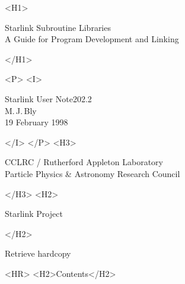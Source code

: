 \documentclass[twoside,11pt]{article}
\newcommand{\stardoccategory}  {Starlink User Note}
\newcommand{\stardocsource}    {sun\stardocnumber}
\newcommand{\stardocnumber}    {202.2}
\newcommand{\stardocauthors}   {M.\,J.\,Bly}
\newcommand{\stardocdate}      {19 February 1998}
\newcommand{\stardoctitle}     {Starlink Subroutine Libraries \\[1.5ex]
                                A Guide for Program Development and Linking}
\newcommand{\stardocversion}   {software\_version}
\newcommand{\stardocmanual}    {manual\_type}
\newcommand{\htmladdnormallink}[2]{#1}
\newcommand{\htmladdimg}[1]{}
\newcommand{\htmlref}[2]{#1}
\newcommand{\htmladdtonavigation}[1]{}
\newcommand{\xlabel}[1]{}
\newcommand{\latexonlytoc}[0]{\tableofcontents}
\begin{document}
\begin{htmlonly}
   \xlabel{}
   \begin{rawhtml} <H1> \end{rawhtml}
      \stardoctitle\\
   \begin{rawhtml} </H1> \end{rawhtml}


   \begin{rawhtml} <P> <I> \end{rawhtml}
   \stardoccategory \stardocnumber \\
   \stardocauthors \\
   \stardocdate
   \begin{rawhtml} </I> </P> <H3> \end{rawhtml}
      \htmladdnormallink{CCLRC}{http://www.cclrc.ac.uk} /
      \htmladdnormallink{Rutherford Appleton Laboratory}
                        {http://www.cclrc.ac.uk/ral} \\
      \htmladdnormallink{Particle Physics \& Astronomy Research Council}
                        {http://www.pparc.ac.uk} \\
   \begin{rawhtml} </H3> <H2> \end{rawhtml}
      \htmladdnormallink{Starlink Project}{http://star-www.rl.ac.uk/}
   \begin{rawhtml} </H2> \end{rawhtml}
   \htmladdnormallink{\htmladdimg{source.gif} Retrieve hardcopy}
      {http://star-www.rl.ac.uk/cgi-bin/hcserver?\stardocsource}\\

  \label{stardoccontents}
  \begin{rawhtml} 
    <HR>
    <H2>Contents</H2>
  \end{rawhtml}
  \renewcommand{\latexonlytoc}[0]{}
  \htmladdtonavigation{\htmlref{\htmladdimg{contents_motif.gif}}
        {stardoccontents}}

\end{htmlonly}
\end{document}
